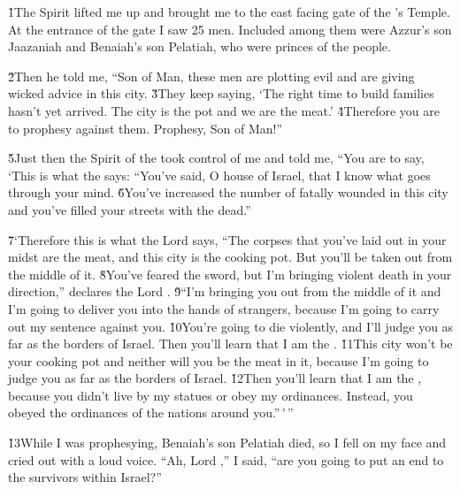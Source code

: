 \v{1}The Spirit lifted me up and brought me to the east facing gate of the 's Temple. At the entrance of the gate I saw 25 men. Included among them were Azzur's son Jaazaniah and Benaiah's son Pelatiah, who were princes of the people.

\v{2}Then he told me, ``Son of Man, these men are plotting evil and are giving wicked advice in this city. \v{3}They keep saying, `The right time to build families hasn't yet arrived. The city is the pot and we are the meat.' \v{4}Therefore you are to prophesy against them. Prophesy, Son of Man!''

\v{5}Just then the Spirit of the  took control of me and told me, ``You are to say, `This is what the  says: ``You've said, O house of Israel, that I know what goes through your mind. \v{6}You've increased the number of fatally wounded in this city and you've filled your streets with the dead.''

\v{7}`Therefore this is what the Lord  says, ``The corpses that you've laid out in your midst are the meat, and this city is the cooking pot. But you'll be taken out from the middle of it. \v{8}You've feared the sword, but I'm bringing violent death in your direction,'' declares the Lord . \v{9}``I'm bringing you out from the middle of it and I'm going to deliver you into the hands of strangers, because I'm going to carry out my sentence against you. \v{10}You're going to die violently, and I'll judge you as far as the borders of Israel. Then you'll learn that I am the . \v{11}This city won't be your cooking pot and neither will you be the meat in it, because I'm going to judge you as far as the borders of Israel. \v{12}Then you'll learn that I am the , because you didn't live by my statues or obey my ordinances. Instead, you obeyed the ordinances of the nations around you.''\,'\,''

\v{13}While I was prophesying, Benaiah's son Pelatiah died, so I fell on my face and cried out with a loud voice. ``Ah, Lord ,'' I said, ``are you going to put an end to the survivors within Israel?''

